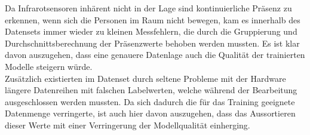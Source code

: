 Da Infrarotsensoren inhärent nicht in der Lage sind kontinuierliche Präsenz zu erkennen, wenn sich die Personen
im Raum nicht bewegen, kam es innerhalb des Datensets immer wieder zu kleinen Messfehlern, die durch die Gruppierung
und Durchschnittsberechnung der Präsenzwerte behoben werden mussten. Es ist klar davon auszugehen, dass eine 
genauere Datenlage auch die Qualität der trainierten Modelle steigern würde.\\
Zusätzlich existierten im Datenset durch seltene Probleme mit der Hardware längere Datenreihen mit falschen 
Labelwerten, welche während der Bearbeitung ausgeschlossen werden mussten. Da sich dadurch die für das Training 
geeignete Datenmenge verringerte, ist auch hier davon auszugehen, dass das Aussortieren dieser Werte
mit einer Verringerung der Modellqualität einherging. 
